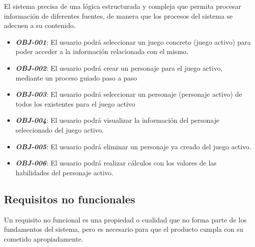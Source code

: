         

    El sistema precisa de una lógica estructurada y compleja que permita procesar 
    información de diferentes fuentes, de manera que los procesos del sistema se 
    adecuen a su contenido.
    \begin{itemize}
        
        \item \textbf{\textit{OBJ-001}}: El usuario podrá seleccionar un juego concreto 
        (juego activo) para poder acceder a la información relacionada con el mismo.

        \item \textbf{\textit{OBJ-002}}: El usuario podrá crear un personaje para el juego activo,
        mediante un proceso guiado paso a paso
        
        \item \textbf{\textit{OBJ-003}}: El usuario podrá seleccionar un personaje (personaje activo) 
        de todos los existentes para el juego activo
        
        \item \textbf{\textit{OBJ-004}}: El usuario podrá visualizar la información del 
        personaje seleccionado del juego activo.
        
        \item \textbf{\textit{OBJ-005}}: El usuario podrá eliminar un personaje ya creado 
        del juego activo.
        
        \item \textbf{\textit{OBJ-006}}: El usuario podrá realizar cálculos con los valores 
        de las habilidades del personaje activo.

    \end{itemize}


\subsection{Requisitos no funcionales}
Un requisito no funcional es una propiedad o cualidad que no forma parte de los 
fundamentos del sistema, pero es necesario para que el producto cumpla con su
cometido apropiadamente. \medskip

